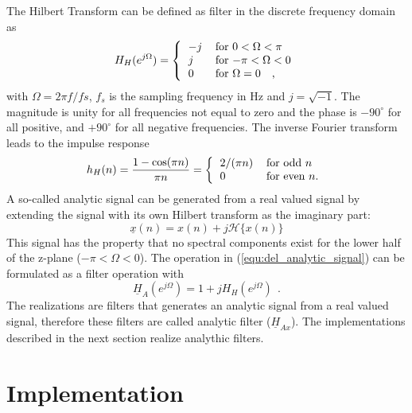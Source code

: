 \documentclass[a4paper,BCOR7mm,12pt,pointlessnumbers,bibtotoc]{scrartcl}
\begin{document}
The Hilbert Transform can be defined as filter in the discrete frequency domain as
\begin{equation}
H_{H}(e^{j \Omega}) =
 \left\{ 
    \begin{tabular}{ll}
    $-j$ & \mbox{for }\mbox{$0 < \Omega < \pi$}\\
    $j$ & \mbox{for }\mbox{$-\pi < \Omega < 0$}\\
    $0$ & \mbox{for }\mbox{$\Omega = 0$} \ \ ,\\
    \end{tabular}
 \right.
\end{equation}
with $\Omega=2\pi f/fs$, $f_s$ is the sampling frequency in Hz and $j=\sqrt{-1}$.
The magnitude is unity for all frequencies not equal to zero and the phase is $-90^\circ$ for all positive, and $+90^\circ$ for all negative frequencies. The inverse Fourier transform leads to the impulse response
\begin{equation}
h_{H}(n) = \frac{1-\cos(\pi n)}{\pi n} =
 \left\{ 
    \begin{tabular}{ll}
    $2/(\pi n)$ & \mbox{for }\mbox{odd}\mbox{ $n$}\\
    $0$ & \mbox{for }\mbox{even}\mbox{ $n$}.\\
    \end{tabular}
 \right.
 \label{equ:disc_hilbert_imp_resp}
\end{equation}
A so-called analytic signal can be generated from a real valued signal by extending the signal with its own Hilbert transform as the imaginary part:
\begin{equation}
	\underline{x}(n)=x(n)+j\mathcal{H}\{x(n)\}
	\label{equ:del_analytic_signal}
\end{equation}
This signal has the property that no spectral components exist for the lower half of the z-plane ($-\pi<\Omega<0$). The operation in (\ref{equ:del_analytic_signal}) can be formulated as a filter operation with
\begin{equation}
	\underline{H}_{A}(e^{j \Omega})=1+j H_{H}(e^{j \Omega}) \ \ .
	\label{equ:def_analytic_filter}
\end{equation}
The realizations are filters that generates an analytic signal from a real valued signal, therefore these filters are called analytic filter ($\underline{H}_{Ax}$). The implementations described in the next section realize analythic filters.

\section{Implementation}
\end{document}

